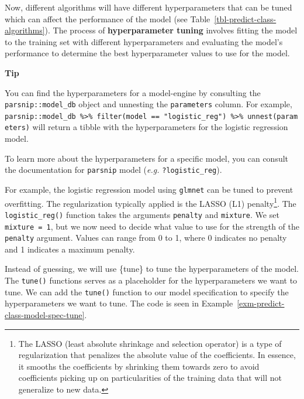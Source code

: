 \documentclass[
  letterpaper,
  krantz1]{latex/krantz-mod}
\theoremstyle{definition}
\theoremstyle{definition}
\theoremstyle{remark}
\begin{document}
Now, different algorithms will have different hyperparameters that can
be tuned which can affect the performance of the model (see
Table~\ref{tbl-predict-class-algorithms}). The process of
\textbf{hyperparameter tuning} involves fitting the model to the
training set with different hyperparameters and evaluating the model's
performance to determine the best hyperparameter values to use for the
model.

\pagebreak

\begin{tcolorbox}[enhanced jigsaw, leftrule=.75mm, colframe=quarto-callout-color-frame, left=2mm, colback=white, toprule=.15mm, breakable, arc=.35mm, opacityback=0, bottomrule=.15mm, rightrule=.15mm]

\textbf{ Tip}

You can find the hyperparameters for a model-engine by consulting the
\texttt{parsnip::model\_db} object and unnesting the \texttt{parameters}
column. For example,
\texttt{parsnip::model\_db\ \%\textgreater{}\%\ filter(model\ ==\ "logistic\_reg")\ \%\textgreater{}\%\ unnest(parameters)}
will return a tibble with the hyperparameters for the logistic
regression model.

To learn more about the hyperparameters for a specific model, you can
consult the documentation for \texttt{parsnip} model (\emph{e.g.}
\texttt{?logistic\_reg}).

\end{tcolorbox}

For example, the logistic regression model using \texttt{glmnet} can be
tuned to prevent overfitting. The regularization typically applied is
the LASSO (L1) penalty\footnote{The LASSO (least absolute shrinkage and
  selection operator) is a type of regularization that penalizes the
  absolute value of the coefficients. In essence, it smooths the
  coefficients by shrinking them towards zero to avoid coefficients
  picking up on particularities of the training data that will not
  generalize to new data.}. The \texttt{logistic\_reg()} function takes
the arguments \texttt{penalty} and \texttt{mixture}. We set
\texttt{mixture\ =\ 1}, but we now need to decide what value to use for
the strength of the \texttt{penalty} argument. Values can range from 0
to 1, where 0 indicates no penalty and 1 indicates a maximum penalty.

Instead of guessing, we will use \{tune\} to tune the hyperparameters of
the model. The \texttt{tune()} functions serves as a placeholder for the
hyperparameters we want to tune. We can add the \texttt{tune()} function
to our model specification to specify the hyperparameters we want to
tune. The code is seen in
Example~\ref{exm-predict-class-model-spec-tune}.
\end{document}
